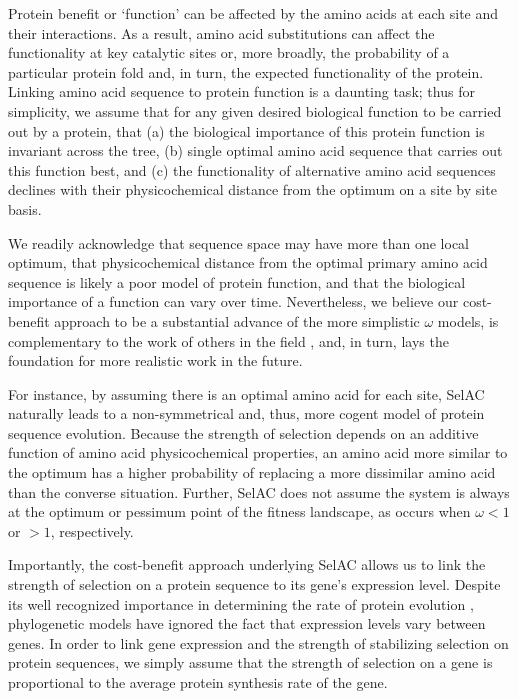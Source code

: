 \documentclass[12pt,letterpaper,fleqn]{article}
\newcommand{\PC}{physicochemical\xspace}
\newcommand{\selac}{SelAC\xspace}
\begin{document}
Protein benefit or `function' can be affected by the amino acids at each site and their interactions.
As a result, amino acid substitutions can affect the functionality at key catalytic sites or, more broadly, the probability of a particular protein fold and, in turn, the expected functionality of the protein.
Linking amino acid sequence to protein function is a daunting task; thus for simplicity, we assume that for any given desired biological function to be carried out by a protein, that (a) the biological importance of this protein function is invariant across the tree, (b) single optimal amino acid sequence that carries out this function best, and (c) the functionality of alternative amino acid sequences declines with their \PC distance from the optimum on a site by site basis.

We readily acknowledge that sequence space may have more than one local optimum, that \PC distance from the optimal primary amino acid sequence is likely a poor model of protein function, and that the biological importance of a function can vary over time.
Nevertheless, we believe our cost-benefit approach to be a substantial advance of the more simplistic $\omega$ models, is complementary to the work of others in the field \citep[e.g.][]{ThorneEtAl2012,RodrigueAndLartillot2014}, and, in turn, lays the foundation for more realistic work in the future.

For instance, by assuming there is an optimal amino acid for each site, \selac naturally leads to a non-symmetrical and, thus, more cogent model of protein sequence evolution.
Because the strength of selection depends on an additive function of amino acid \PC properties, an amino acid more similar to the optimum has a higher probability of replacing a more dissimilar amino acid than the converse situation.
Further, \selac does not assume the system is always at the optimum or pessimum point of the fitness landscape, as occurs when $\omega < 1$ or $>1$, respectively.

Importantly, the cost-benefit approach underlying \selac allows us to link the strength of selection on a protein sequence to its gene's expression level.
Despite its well recognized importance in determining the rate of protein evolution \citep[e.g.][]{DrummondEtAl2005,DrummondEtAl2006a}, phylogenetic models have ignored the fact that expression levels vary between genes.
In order to link gene expression and the strength of stabilizing selection on protein sequences, we simply assume that the strength of selection on a gene is proportional to the average protein synthesis rate of the gene.
\end{document}
